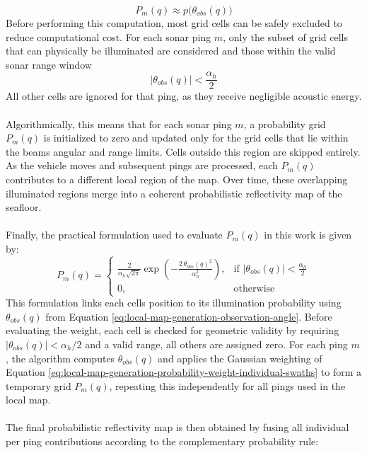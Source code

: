 $$
    P_m(q) \approx p\big(\theta_{obs}(q)\big)
$$
Before performing this computation, most grid cells can be safely excluded to reduce computational cost. For each sonar ping $m$, only the subset of grid cells that can physically be illuminated are considered and those within the valid sonar range window
$$
    |\theta_{obs}(q)| < \frac{\alpha_h}{2}
$$
All other cells are ignored for that ping, as they receive negligible acoustic energy.
\\ \\
Algorithmically, this means that for each sonar ping $m$, a probability grid $P_m(q)$ is initialized to zero and updated only for the grid cells that lie within the beams angular and range limits. Cells outside this region are skipped entirely. As the vehicle moves and subsequent pings are processed, each $P_m(q)$ contributes to a different local region of the map. Over time, these overlapping illuminated regions merge into a coherent probabilistic reflectivity map of the seafloor.
\\ \\
Finally, the practical formulation used to evaluate $P_m(q)$ in this work is given by:
\begin{equation}
    P_m(q) =
    \begin{cases}
        \displaystyle
        \frac{2}{\alpha_h \sqrt{2\pi}} 
        \exp\!\left(-\frac{2\,\theta_{obs}(q)^2}{\alpha_h^2}\right),
        & \text{if } |\theta_{obs}(q)| < \frac{\alpha_h}{2} \\[1.0em]
        0, & \text{otherwise}
    \end{cases}
    \label{eq:local-map-generation-probability-weight-individual-swaths}
\end{equation}
This formulation links each cells position to its illumination probability using $\theta_{obs}(q)$ from Equation \ref{eq:local-map-generation-observation-angle}. Before evaluating the weight, each cell is checked for geometric validity by requiring $|\theta_{obs}(q)| < \alpha_h/2$ and a valid range, all others are assigned zero. For each ping $m$, the algorithm computes $\theta_{obs}(q)$ and applies the Gaussian weighting of Equation \ref{eq:local-map-generation-probability-weight-individual-swaths} to form a temporary grid $P_m(q)$, repeating this independently for all pings used in the local map.
\\ \\
The final probabilistic reflectivity map is then obtained by fusing all individual per ping contributions according to the complementary probability rule:
